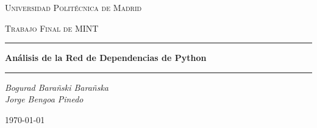 \documentclass[12pt,a4paper]{report}
\begin{document}
	
	\begin{titlepage}
		\centering
		\vspace*{2cm}
		
		
		{\scshape\LARGE Universidad Politécnica de Madrid \par}
		\vspace{1cm}
		{\scshape\Large Trabajo Final de MINT\par}
		\vspace{1.5cm}
		
		\rule{\textwidth}{0.4pt}\par
		\vspace{0.4cm}
		{\huge\bfseries Análisis de la Red de Dependencias de Python\par}
		\vspace{0.4cm}
		\rule{\textwidth}{0.4pt}\par
		\vspace{2cm}
		
		{\Large\itshape
			Bogurad Barañski Barañska \\
			Jorge Bengoa Pinedo\par
		}
		\vspace{2cm}
		
		\vfill
		
		\vspace{2cm}
		{\large \today\par}
	\end{titlepage}
	
	\tableofcontents
	\newpage
	
	
	
\end{document}
